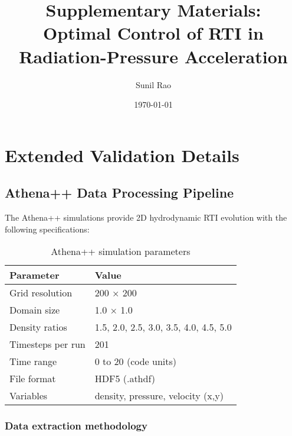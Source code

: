\documentclass[aps,pre,twocolumn,superscriptaddress]{revtex4-2}
\begin{document}
\title{Supplementary Materials:\\
Optimal Control of RTI in Radiation-Pressure Acceleration}

\author{Sunil Rao}

\date{\today}

\maketitle

\section{Extended Validation Details}

\subsection{Athena++ Data Processing Pipeline}

The Athena++ simulations provide 2D hydrodynamic RTI evolution with the following specifications:

\begin{table}[h]
\caption{Athena++ simulation parameters}
\begin{ruledtabular}
\begin{tabular}{ll}
Parameter & Value \\
\hline
Grid resolution & 200 × 200 \\
Domain size & 1.0 × 1.0 \\
Density ratios & 1.5, 2.0, 2.5, 3.0, 3.5, 4.0, 4.5, 5.0 \\
Timesteps per run & 201 \\
Time range & 0 to 20 (code units) \\
File format & HDF5 (.athdf) \\
Variables & density, pressure, velocity (x,y) \\
\end{tabular}
\end{ruledtabular}
\end{table}

\subsubsection{Data extraction methodology}
\end{document}
